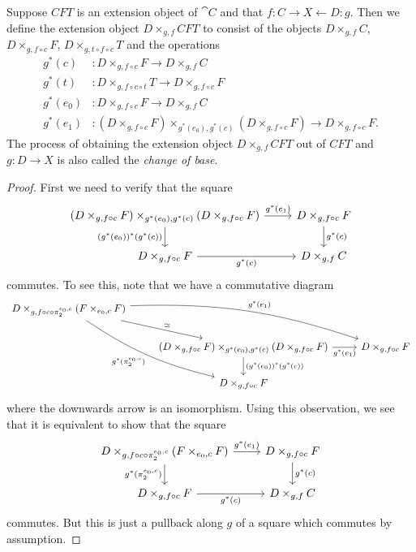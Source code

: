 \begin{defn}
Suppose $CFT$ is an extension object of $\cat{C}$ and that $f:C\rightarrow X\leftarrow D:g$.
Then we define the extension object $D\times_{g,f} CFT$ to consist of the objects $D\times_{g,f} C$,
$D\times_{g,f\circ c} F$, $D\times_{g,t\circ f\circ c} T$ and the operations
\begin{align*}
g^\ast(c) & : D\times_{g,f\circ c} F\to D\times_{g,f} C\\
g^\ast(t) & : D\times_{g,f\circ c\circ t} T\to D\times_{g,f\circ c} F\\
g^\ast(e_0) & : D\times_{g,f\circ c} F\to D\times_{g,f} C\\
g^\ast(e_1) & : (D\times_{g,f\circ c} F) \times_{g^\ast(e_0),g^\ast(c)} (D\times_{g,f\circ c} F)\to D\times_{g,f\circ c} F.
\end{align*}
The process of obtaining the extension object $D\times_{g,f} CFT$ out of $CFT$
and $g:D\to X$ is also called the \emph{change of base}.
\end{defn}

\begin{proof}
First we need to verify that the square
\begin{equation*}
\begin{tikzcd}
(D\times_{g,f\circ c} F) \times_{g^\ast(e_0),g^\ast(c)} (D\times_{g,f\circ c} F)
  \ar{r}{g^\ast(e_1)} 
  \ar{d}[swap]{(g^\ast(e_0))^\ast(g^\ast(c))} 
  & 
D\times_{g,f\circ c} F
  \ar{d}{g^\ast(c)}
  \\
D\times_{g,f\circ c} F
  \ar{r}[swap]{g^\ast(c)} 
  & 
D\times_{g,f} C
\end{tikzcd}
\end{equation*}
commutes. To see this, note that we have a commutative diagram
\begin{equation*}
\begin{tikzcd}
D\times_{g,f\circ c\circ \pi_2^{e_0,c}}(F\times_{e_0,c} F)  
  \ar[bend right=10]{ddr}[swap]{g^\ast(\pi_2^{e_0,c})}
  \ar[bend left=10]{drr}{g^\ast(e_1)}
  \ar{dr}{\simeq}
  \\
  {}
  &
(D\times_{g,f\circ c} F)\times_{g^\ast(e_0),g^\ast(c)}(D\times_{g,f\circ c} F)
  \ar{r}[swap]{g^\ast(e_1)}
  \ar{d}{(g^\ast(e_0))^\ast(g^\ast(c))}
  &
  D\times_{g,f\circ c} F
  \\
  {}
  &
D\times_{g,f\circ c} F
  &
{}
\end{tikzcd}
\end{equation*}
where the downwards arrow is an isomorphism. Using this observation, we see that
it is equivalent to show that the square
\begin{equation*}
\begin{tikzcd}
D\times_{g,f\circ c\circ \pi_2^{e_0,c}}(F\times_{e_0,c} F)
  \ar{r}{g^\ast(e_1)} 
  \ar{d}[swap]{g^\ast(\pi_2^{e_0,c})} 
  & 
D\times_{g,f\circ c} F
  \ar{d}{g^\ast(c)}
  \\
D\times_{g,f\circ c} F
  \ar{r}[swap]{g^\ast(c)} 
  & 
D\times_{g,f} C
\end{tikzcd}
\end{equation*}
commutes. But this is just a pullback along $g$ of a square which commutes by assumption.
\end{proof}

